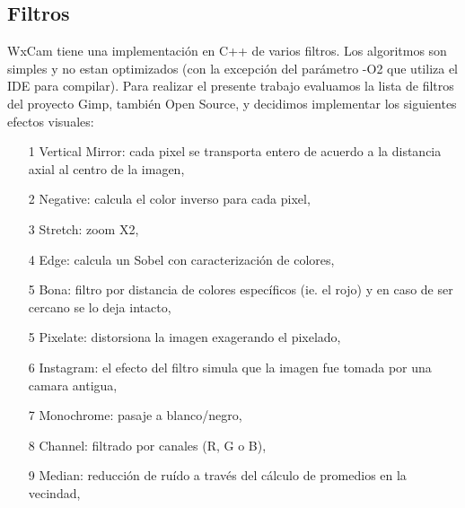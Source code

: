 \subsection{Filtros}
WxCam tiene una implementaci\'on en C++ de varios filtros. Los algoritmos son simples y no estan optimizados (con la excepci\'on del par\'ametro -O2 que utiliza el IDE para compilar). Para realizar el presente trabajo evaluamos la lista de filtros del proyecto Gimp, tambi\'en Open Source, y decidimos implementar los siguientes efectos visuales: \\
\begin{itemize}
\item[1] Vertical Mirror: cada pixel se transporta entero de acuerdo a la distancia axial al centro de la imagen,
\item[2] Negative: calcula el color inverso para cada pixel,
\item[3] Stretch: zoom X2,
\item[4] Edge: calcula un Sobel con caracterizaci\'on de colores,
\item[5] Bona: filtro por distancia de colores espec\'ificos (ie. el rojo) y en caso de ser cercano se lo deja intacto,
\item[5] Pixelate: distorsiona la imagen exagerando el pixelado,
\item[6] Instagram: el efecto del filtro simula que la imagen fue tomada por una camara antigua,
\item[7] Monochrome: pasaje a blanco/negro,
\item[8] Channel: filtrado por canales (R, G o B),
\item[9] Median: reducci\'on de ru\'ido a trav\'es del c\'alculo de promedios en la vecindad,
\end{itemize}
